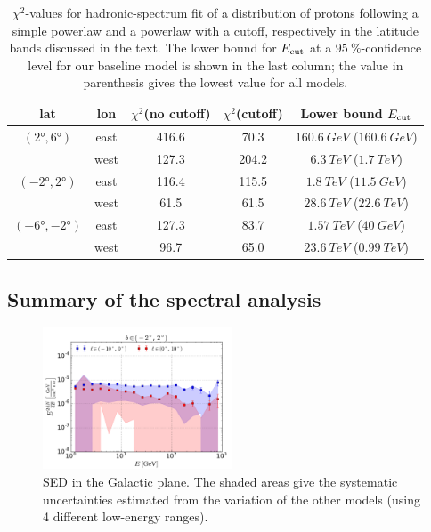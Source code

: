 \begin{table}
  \begin{center}
    \caption{$\chi^2$-values for hadronic-spectrum fit of a distribution of protons following a simple powerlaw and a powerlaw with a cutoff, respectively in the latitude bands discussed in the text. The lower bound for $E_{\text{cut}}$ at a $\SI{95}{\percent}$-confidence level for our baseline model is shown in the last column; the value in parenthesis gives the lowest value for all models.}
    \label{tab:pi0}
    \begin{tabular}{|c|c|c|c|c|} %
     	\hline
		 lat & lon  & $\chi^2$(no cutoff) &  $\chi^2$(cutoff) & Lower bound $E_{\text{cut}}$ \\ 
		\hline
  		$(\ang{2}, \ang{6})$ & east & 416.6 & 70.3 & $\SI{160.6}{GeV}$ ($\SI{160.6}{GeV}$)\\ 
		& west &  127.3 & 204.2 & $\SI{6.3}{TeV}$ ($\SI{1.7}{TeV}$)\\ 
 		\hline
  		$(\ang{-2}, \ang{2})$ & east & 116.4 & 115.5 & $\SI{1.8}{TeV}$ ($\SI{11.5}{GeV}$)\\ 
		& west & 61.5 & 61.5 & $\SI{28.6}{TeV}$ ($\SI{22.6}{TeV}$)\\ 
 		\hline
  		$(\ang{-6}, \ang{-2})$ & east & 127.3 & 83.7 & $\SI{1.57}{TeV}$ ($\SI{40}{GeV}$)\\ 
		& west & 96.7 & 65.0 & $\SI{23.6}{TeV}$ ($\SI{0.99}{TeV}$)\\ 
 \hline
    \end{tabular}
  \end{center}
\end{table}


\subsection{Summary of the spectral analysis}

\begin{figure}[h]
\centering
 \includegraphics[width=0.5\textwidth]{plots/Summary_SED_0.pdf}
 \caption{SED in the Galactic plane. The shaded areas give the systematic uncertainties estimated from the variation of the other models (using 4 different low-energy ranges).}
 \label{fig:data_diff}
\end{figure}